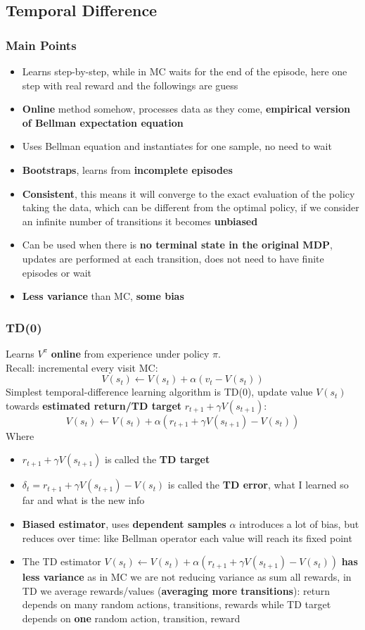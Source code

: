 \subsection{Temporal Difference}
\subsubsection{Main Points}
    \begin{itemize}
        \item Learns step-by-step, while in MC waits for the end of the episode, here one step with real reward and the followings are guess
        \item \textbf{Online} method somehow, processes data as they come, \textbf{empirical version of Bellman expectation equation}
        \item Uses Bellman equation and instantiates for one sample, no need to wait
        \item \textbf{Bootstraps}, learns from \textbf{incomplete episodes}
        \item \textbf{Consistent}, this means it will converge to the exact evaluation of the policy taking the data, which can be different from the optimal policy, if we consider an infinite number of transitions it becomes \textbf{unbiased}
        \item Can be used when there is \textbf{no terminal state in the original MDP}, updates are performed at each transition, does not need to have finite episodes or wait
        \item \textbf{Less variance} than MC, \textbf{some bias}
    \end{itemize}
\subsubsection{TD(0)}
    Learns $V^\pi$ \textbf{online} from experience under policy $\pi$.\\
    Recall: incremental every visit MC:
    $$V(s_t)\leftarrow V(s_t)+\alpha (v_t-V(s_t))$$
    Simplest temporal-difference learning algorithm is TD(0), update value $V(s_t)$ towards \textbf{estimated return/TD target} $r_{t+1}+\gamma V(s_{t+1})$:
    $$V(s_t)\leftarrow V(s_t)+\alpha (r_{t+1}+\gamma V(s_{t+1})-V(s_t))$$
    Where
    \begin{itemize}
        \item $r_{t+1}+\gamma V(s_{t+1})$ is called the \textbf{TD target}
        \item $\delta_t=r_{t+1}+\gamma V(s_{t+1})-V(s_t)$ is called the \textbf{TD error}, what I learned so far and what is the new info
        \item \textbf{Biased estimator}, uses \textbf{dependent samples} $\alpha$ introduces a lot of bias, but reduces over time: like Bellman operator each value will reach its fixed point
        \item The TD estimator $V(s_t)\leftarrow V(s_t)+\alpha (r_{t+1}+\gamma V(s_{t+1})-V(s_t))$ \textbf{has less variance} as in MC we are not reducing variance as sum all rewards, in TD we average rewards/values (\textbf{averaging more transitions}): return depends on many random actions, transitions, rewards while TD target depends on \textbf{one} random action, transition, reward
    \end{itemize}
